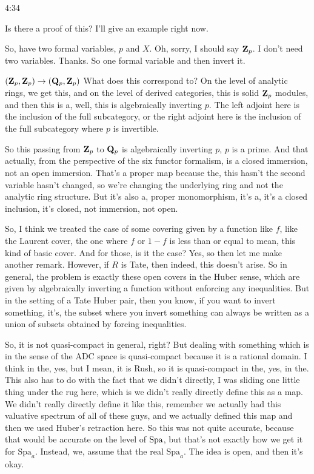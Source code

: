 \begin{unfinished}{4:34}
\begin{example}
Is there a proof of this? I'll give an example right now.

So, have two formal variables, $p$ and $X$. Oh, sorry, I should say $\mathbf Z_p$. I don't need two variables. Thanks. So one formal variable and then invert it. 

$ (\mathbf Z_p, \mathbf Z_p) \rightarrow (\mathbf Q_p, \mathbf Z_p)$
What does this correspond to? On the level of analytic rings, we get this, and on the level of derived categories, this is solid $\mathbf Z_p$ modules, and then this is a, well, this is algebraically inverting $p$. The left adjoint here is the inclusion of the full subcategory, or the right adjoint here is the inclusion of the full subcategory where $p$ is invertible.

So this passing from $\mathbf Z_p$ to $\mathbf Q_p$ is algebraically inverting $p$, $p$ is a prime. And that actually, from the perspective of the six functor formalism, is a closed immersion, not an open immersion. That's a proper map because the, this hasn't the second variable hasn't changed, so we're changing the underlying ring and not the analytic ring structure. But it's also a, proper monomorphism, it's a, it's a closed inclusion, it's closed, not immersion, not open.

So, I think we treated the case of some covering given by a function like $f$, like the Laurent cover, the one where $f$ or $1-f$ is less than or equal to mean, this kind of basic cover. And for those, is it the case? Yes, so then let me make another remark. However, if $R$ is Tate, then indeed, this doesn't arise. So in general, the problem is exactly these open covers in the Huber sense, which are given by algebraically inverting a function without enforcing any inequalities. But in the setting of a Tate Huber pair, then you know, if you want to invert something, it's, the subset where you invert something can always be written as a union of subsets obtained by forcing inequalities.

So, it is not quasi-compact in general, right? But dealing with something which is in the sense of the ADC space is quasi-compact because it is a rational domain. I think in the, yes, but I mean, it is Rush, so it is quasi-compact in the, yes, in the. This also has to do with the fact that we didn't directly, I was sliding one little thing under the rug here, which is we didn't really directly define this as a map. We didn't really directly define it like this, remember we actually had this valuative spectrum of all of these guys, and we actually defined this map and then we used Huber's retraction here. So this was not quite accurate, because that would be accurate on the level of $\operatorname{Spa}$, but that's not exactly how we get it for $\mathrm{Spa}_a$. Instead, we, assume that the real $\mathrm{Spa}_a$. The idea is open, and then it's okay.


\end{example}
\end{unfinished}
